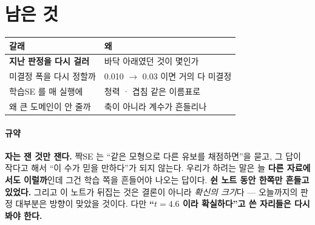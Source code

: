 \documentclass[10pt]{article}
\begin{document}
\section{남은 것}
\begin{center}\footnotesize
\begin{tabular}{ll}
\hline
갈래 & 왜 \\
\hline
\textbf{지난 판정을 다시 걸러} & 바닥 아래였던 것이 몇인가 \\
미결정 폭을 다시 정할까 & 0.010 $\to$ 0.03 이면 거의 다 미결정 \\
학습SE 를 매 실행에 & 청력 · 겹침 같은 이름표로 \\
왜 큰 도메인이 안 줄까 & 축이 아니라 계수가 흔들리나 \\
\hline
\end{tabular}
\end{center}

\paragraph{규약} \textbf{자는 잰 것만 잰다.} 짝SE 는 ``같은 모형으로 다른
유보를 채점하면''을 묻고, 그 답이 작다고 해서 ``이 수가 믿을 만하다''가
되지 않는다. 우리가 하려는 말은 늘 \textbf{다른 자료에서도 이럴까}인데
그건 학습 쪽을 흔들어야 나오는 답이다. \textbf{쉰 노트 동안 한쪽만 흔들고
있었다.} 그리고 이 노트가 뒤집는 것은 결론이 아니라 \emph{확신의 크기}다
--- 오늘까지의 판정 대부분은 방향이 맞았을 것이다. 다만
\textbf{``$t{=}4.6$ 이라 확실하다''고 쓴 자리들은 다시 봐야 한다.}
\end{document}
